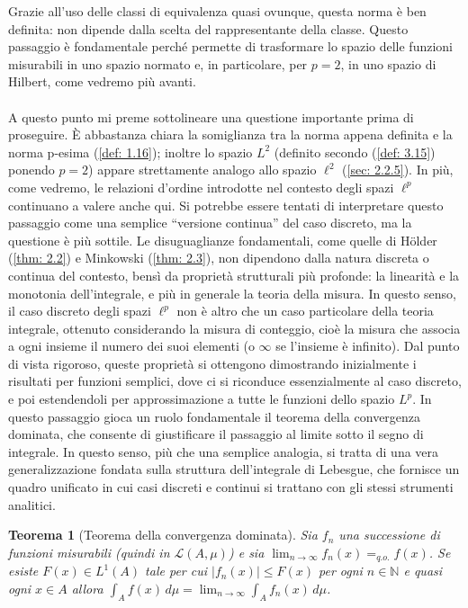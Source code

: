 \documentclass[a4paper,12pt]{report}
\newtheorem{teorema}{Teorema}[chapter]
\begin{document}
Grazie all’uso delle classi di equivalenza quasi ovunque, questa norma è ben definita: non dipende dalla scelta del rappresentante della classe. Questo passaggio è fondamentale perché permette di trasformare lo spazio delle funzioni misurabili in uno spazio normato e, in particolare, per $p=2$, in uno spazio di Hilbert, come vedremo più avanti.
\\
\\A questo punto mi preme sottolineare una questione importante prima di proseguire. È abbastanza chiara la somiglianza tra la norma appena definita e la norma p-esima (\ref{def: 1.16}); inoltre lo spazio $L^2$ (definito secondo (\ref{def: 3.15}) ponendo $p=2$) appare strettamente analogo allo spazio $\ell^2$ (\ref{sec: 2.2.5}). In più, come vedremo, le relazioni d’ordine introdotte nel contesto degli spazi $\ell^p$ continuano a valere anche qui.
Si potrebbe essere tentati di interpretare questo passaggio come una semplice “versione continua” del caso discreto, ma la questione è più sottile. Le disuguaglianze fondamentali, come quelle di Hölder (\ref{thm: 2.2}) e Minkowski (\ref{thm: 2.3}), non dipendono dalla natura discreta o continua del contesto, bensì da proprietà strutturali più profonde: la linearità e la monotonia dell’integrale, e più in generale la teoria della misura. In questo senso, il caso discreto degli spazi $\ell^p$ non è altro che un caso particolare della teoria integrale, ottenuto considerando la misura di conteggio, cioè la misura che associa a ogni insieme il numero dei suoi elementi (o $\infty$ se l’insieme è infinito).
Dal punto di vista rigoroso, queste proprietà si ottengono dimostrando inizialmente i risultati per funzioni semplici, dove ci si riconduce essenzialmente al caso discreto, e poi estendendoli per approssimazione a tutte le funzioni dello spazio $L^p$. In questo passaggio gioca un ruolo fondamentale il teorema della convergenza dominata, che consente di giustificare il passaggio al limite sotto il segno di integrale. In questo senso, più che una semplice analogia, si tratta di una vera generalizzazione fondata sulla struttura dell'integrale di Lebesgue, che fornisce un quadro unificato in cui casi discreti e continui si trattano con gli stessi strumenti analitici.
\\
\begin{teorema}[Teorema della convergenza dominata]\label{thm: 3.3}
    Sia $f_n$ una successione di funzioni misurabili (quindi in $\mathcal{L}(A,\mu)$) e sia $\displaystyle\lim_{n\to\infty}f_n(x)=_{q.o.}f(x)$. Se esiste $F(x) \in L^1(A)$ tale per cui $|f_n(x)| \leq F(x)$ per ogni $n\in \mathbb{N}$ e quasi ogni $x\in A$ allora $\displaystyle\int_Af(x)\,d\mu=\lim_{n\to\infty}\int_Af_n(x)\,d\mu$.
\end{teorema}
\newpage
\end{document}
